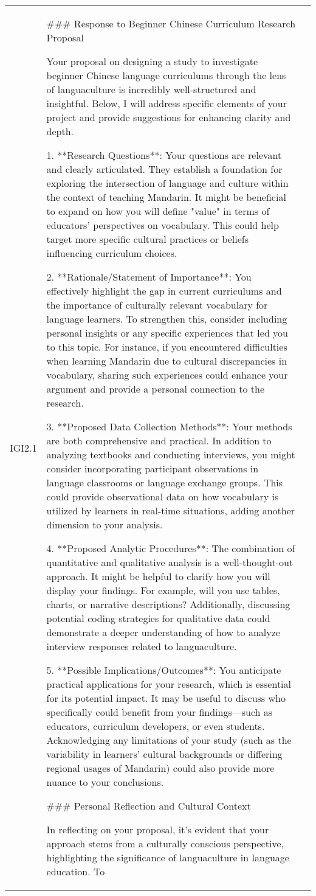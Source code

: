 \begin{center}
\begin{longtable}{|p{}|p{}|p{}|}
IGI2.1 & \#\#\# Response to Beginner Chinese Curriculum Research Proposal\par Your proposal on designing a study to investigate beginner Chinese language curriculums through the lens of languaculture is incredibly well-structured and insightful. Below, I will address specific elements of your project and provide suggestions for enhancing clarity and depth.\par 1. **Research Questions**: Your questions are relevant and clearly articulated. They establish a foundation for exploring the intersection of language and culture within the context of teaching Mandarin. It might be beneficial to expand on how you will define "value" in terms of educators’ perspectives on vocabulary. This could help target more specific cultural practices or beliefs influencing curriculum choices.\par 2. **Rationale/Statement of Importance**: You effectively highlight the gap in current curriculums and the importance of culturally relevant vocabulary for language learners. To strengthen this, consider including personal insights or any specific experiences that led you to this topic. For instance, if you encountered difficulties when learning Mandarin due to cultural discrepancies in vocabulary, sharing such experiences could enhance your argument and provide a personal connection to the research.\par 3. **Proposed Data Collection Methods**: Your methods are both comprehensive and practical. In addition to analyzing textbooks and conducting interviews, you might consider incorporating participant observations in language classrooms or language exchange groups. This could provide observational data on how vocabulary is utilized by learners in real-time situations, adding another dimension to your analysis.\par 4. **Proposed Analytic Procedures**: The combination of quantitative and qualitative analysis is a well-thought-out approach. It might be helpful to clarify how you will display your findings. For example, will you use tables, charts, or narrative descriptions? Additionally, discussing potential coding strategies for qualitative data could demonstrate a deeper understanding of how to analyze interview responses related to languaculture.\par 5. **Possible Implications/Outcomes**: You anticipate practical applications for your research, which is essential for its potential impact. It may be useful to discuss who specifically could benefit from your findings—such as educators, curriculum developers, or even students. Acknowledging any limitations of your study (such as the variability in learners' cultural backgrounds or differing regional usages of Mandarin) could also provide more nuance to your conclusions.\par \#\#\# Personal Reflection and Cultural Context\par In reflecting on your proposal, it’s evident that your approach stems from a culturally conscious perspective, highlighting the significance of languaculture in language education. To 
\end{longtable}
\end{center}
